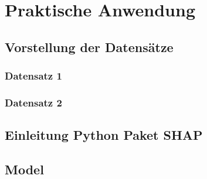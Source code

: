 \chapter{Praktische Anwendung}

\section{Vorstellung der Datensätze}
\subsection{Datensatz 1}
\subsection{Datensatz 2}
\section{Einleitung Python Paket SHAP}

\section{Model}

